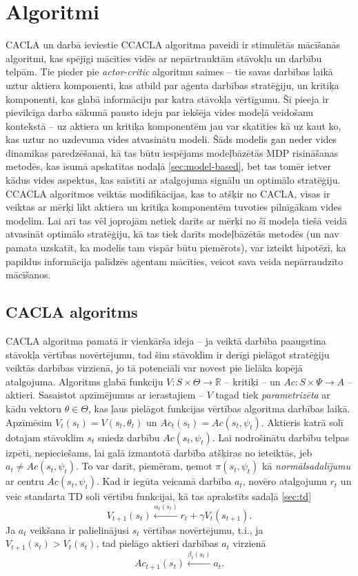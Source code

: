 \documentclass{ludis} %
\begin{document}
\chapter{Algoritmi}
CACLA un darbā ieviestie CCACLA algoritma paveidi ir stimulētās mācīšanās
algoritmi, kas spējīgi mācīties vidēs ar nepārtrauktām stāvokļu un darbību
telpām. Tie pieder pie \textit{actor-critic} algoritmu saimes -- tie savas
darbības laikā uztur aktiera komponenti, kas atbild par aģenta darbības
stratēģiju, un kritiķa komponenti, kas glabā informāciju par katra stāvokļa
vērtīgumu. Šī pieeja ir pievilcīga darba sākumā pausto ideju par iekšēja vides
modeļā veidošanu kontekstā -- uz aktiera un kritiķa komponentēm jau var
skatīties kā uz kaut ko, kas uztur no uzdevuma vides atvasinātu modeli. Šāds
modelis gan neder vides dinamikas paredzēšanai, kā tas būtu iespējams
modeļbāzētās MDP risināšanas metodēs, kas īsumā apskatītas nodaļā
\ref{sec:model-based}, bet tas tomēr ietver kādus vides aspektus, kas saistīti
ar atalgojuma signālu un optimālo stratēģiju. CCACLA algoritmos veiktās
modifikācijas, kas to atšķir no CACLA, visas ir veiktas ar mērķi likt aktiera un
kritiķa komponentēm tuvoties pilnīgākam vides modelim. Lai arī tas vēl joprojām
netiek darīts ar mērķi no šī modeļa tiešā veidā atvasināt optimālo stratēģiju,
kā tas tiek darīts modeļbāzētās metodēs (un nav pamata uzskatīt, ka modelis tam
vispār būtu piemērots), var izteikt hipotēzi, ka papildus informācija palīdzēs
aģentam mācīties, veicot sava veida nepārraudzīto mācīšanos.

\section{CACLA algoritms}
CACLA algoritma pamatā ir vienkārša ideja -- ja veiktā darbība paaugstina
stāvokļa vērtības novērtējumu, tad šim stāvoklim ir derīgi pielāgot stratēģiju
veiktās darbības virzienā, jo tā potenciāli var novest pie lielāka kopējā
atalgojuma.
Algoritms glabā funkciju $V:S \times \Theta \rightarrow \mathbb{R}$ -- kritiķi
-- un $Ac : S \times \Psi \rightarrow A$ -- aktieri. Sasaistot apzīmējumus ar
ierastajiem -- $V$ tagad tiek \textit{parametrizēta} ar kādu vektoru $\theta \in
\Theta$, kas ļaus pielāgot funkcijas vērtības algoritma darbības laikā.
Apzīmēsim $V_t(s_t) = V(s_t, \theta_t)$ un $Ac_t(s_t) = Ac(s_t, \psi_t)$.
Aktieris katrā solī dotajam stāvoklim $s_t$ sniedz darbību $Ac(s_t, \psi_t)$.
Lai nodrošinātu darbību telpas izpēti, nepieciešams, lai galā izmantotā darbība
atšķiras no ieteiktās, jeb $a_t \neq Ac(s_t, \psi_t)$. To var darīt, piemēram,
ņemot $\pi(s_t, \psi_t)$ kā \textit{normālsadalījumu} ar centru $Ac(s_t,
\psi_t)$. Kad ir iegūta veicamā darbība $a_t$, novēro atalgojumu $r_t$ un veic
standarta TD soli vērtību funkcijai, kā tas aprakstīts sadaļā \ref{sec:td}
\[
	V_{t+1}(s_t) \xleftarrow{\alpha_t(s_t)} r_t + \gamma V_t(s_{t + 1}).
\]
Ja $a_t$ veikšana ir palielinājusi $s_t$ vērtības novērtējumu, t.i., ja
$V_{t+1}(s_t) > V_t(s_t)$, tad pielāgo aktieri darbības $a_t$ virzienā
\[
	Ac_{t+1}(s_t) \xleftarrow{\beta_t(s_t)} a_t.
\]
\end{document}
